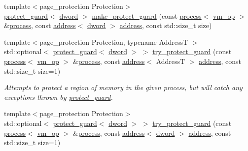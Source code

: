 \begin{DoxyCompactItemize}
\item 
{\footnotesize template$<$page\+\_\+protection Protection$>$ }\\\mbox{\hyperlink{classdistant_1_1memory_1_1protect__guard}{protect\+\_\+guard}}$<$ \mbox{\hyperlink{namespacedistant_a9fa41a5a1a17dcbd24da1c1855c92489}{dword}} $>$ \mbox{\hyperlink{namespacedistant_1_1memory_a157d87a06b5c0fc6efaf536407c37a31}{make\+\_\+protect\+\_\+guard}} (const \mbox{\hyperlink{classdistant_1_1kernel__objects_1_1process}{process}}$<$ \mbox{\hyperlink{namespacedistant_af02d4223cd2f509cc373ac9d83655f19}{vm\+\_\+op}} $>$ \&\mbox{\hyperlink{classdistant_1_1kernel__objects_1_1process}{process}}, const \mbox{\hyperlink{classdistant_1_1memory_1_1address}{address}}$<$ \mbox{\hyperlink{namespacedistant_a9fa41a5a1a17dcbd24da1c1855c92489}{dword}} $>$ \mbox{\hyperlink{classdistant_1_1memory_1_1address}{address}}, const std\+::size\+\_\+t size)
\item 
{\footnotesize template$<$page\+\_\+protection Protection, typename AddressT $>$ }\\std\+::optional$<$ \mbox{\hyperlink{classdistant_1_1memory_1_1protect__guard}{protect\+\_\+guard}}$<$ \mbox{\hyperlink{namespacedistant_a9fa41a5a1a17dcbd24da1c1855c92489}{dword}} $>$ $>$ \mbox{\hyperlink{namespacedistant_1_1memory_a9a400d3aaa98b8153eb0876ef216cae6}{try\+\_\+protect\+\_\+guard}} (const \mbox{\hyperlink{classdistant_1_1kernel__objects_1_1process}{process}}$<$ \mbox{\hyperlink{namespacedistant_af02d4223cd2f509cc373ac9d83655f19}{vm\+\_\+op}} $>$ \&\mbox{\hyperlink{classdistant_1_1kernel__objects_1_1process}{process}}, const \mbox{\hyperlink{classdistant_1_1memory_1_1address}{address}}$<$ AddressT $>$ \mbox{\hyperlink{classdistant_1_1memory_1_1address}{address}}, const std\+::size\+\_\+t size=1)
\begin{DoxyCompactList}\small\item\em Attempts to protect a region of memory in the given process, but will catch any exceptions thrown by \mbox{\hyperlink{classdistant_1_1memory_1_1protect__guard}{protect\+\_\+guard}}. \end{DoxyCompactList}\item 
{\footnotesize template$<$page\+\_\+protection Protection$>$ }\\std\+::optional$<$ \mbox{\hyperlink{classdistant_1_1memory_1_1protect__guard}{protect\+\_\+guard}}$<$ \mbox{\hyperlink{namespacedistant_a9fa41a5a1a17dcbd24da1c1855c92489}{dword}} $>$ $>$ \mbox{\hyperlink{namespacedistant_1_1memory_a60d112d11d35e12bc9482612aa4fa54e}{try\+\_\+protect\+\_\+guard}} (const \mbox{\hyperlink{classdistant_1_1kernel__objects_1_1process}{process}}$<$ \mbox{\hyperlink{namespacedistant_af02d4223cd2f509cc373ac9d83655f19}{vm\+\_\+op}} $>$ \&\mbox{\hyperlink{classdistant_1_1kernel__objects_1_1process}{process}}, const \mbox{\hyperlink{classdistant_1_1memory_1_1address}{address}}$<$ \mbox{\hyperlink{namespacedistant_a9fa41a5a1a17dcbd24da1c1855c92489}{dword}} $>$ \mbox{\hyperlink{classdistant_1_1memory_1_1address}{address}}, const std\+::size\+\_\+t size=1)

\end{DoxyCompactItemize}
